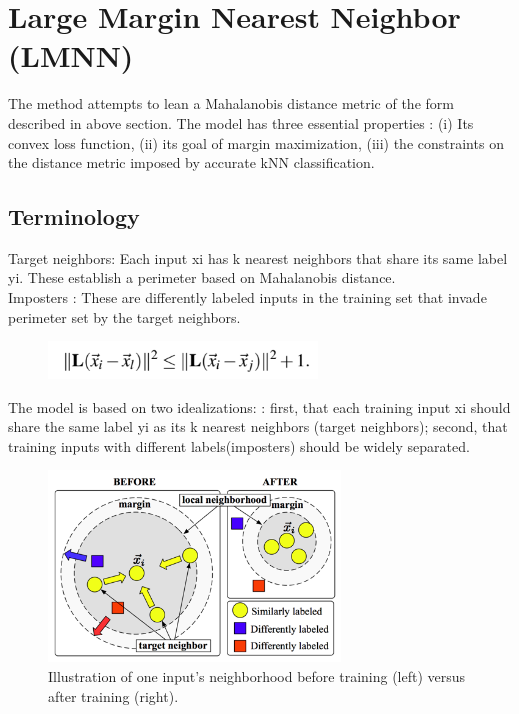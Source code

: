\documentclass{article}
\begin{document}

\section{Large Margin Nearest Neighbor (LMNN)}\label{sec:lmnn}
The method attempts to lean a Mahalanobis distance metric of the form described in above section.
The model has three essential properties : 
(i) Its convex loss function, (ii) its goal of margin maximization, (iii) the constraints on the distance metric imposed by accurate kNN classification.

\subsection{Terminology}
Target neighbors: Each input xi has k nearest neighbors that share its same label yi. These establish a perimeter based on Mahalanobis distance.\\
[0.5cm]
Imposters : These are differently labeled inputs in the training set that invade perimeter set by the target neighbors.
\begin{figure}[H]
    \centering
    \includegraphics[height=1cm]{./lmnn_eq1.png}
\end{figure}
The model is based on two idealizations: : first, that each training input xi should share the same label yi as its k nearest neighbors (target neighbors); second, that training inputs with different labels(imposters) should be widely separated.

\begin{figure}[H]
    \centering
    \includegraphics[height=2in]{./lmnn_img1.png}
    \caption[LMNN method working]{Illustration of one input’s neighborhood before training (left) versus after training (right). }
    \label{fig:fig_name}
    
\end{figure}
\end{document}
